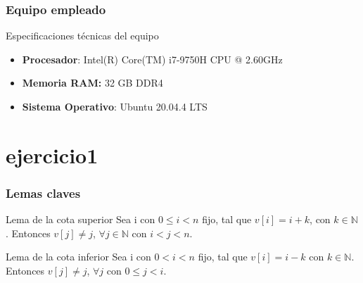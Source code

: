 \documentclass[13pt]{beamer}
\begin{document}
    \begin{frame}
        \frametitle{Equipo empleado}

        \begin{block}{Especificaciones técnicas del equipo}
            \begin{itemize}
                \item \textbf{Procesador}: Intel(R) Core(TM) i7-9750H CPU @ 2.60GHz
                \item \textbf{Memoria RAM:} 32 GB DDR4
                \item \textbf{Sistema Operativo}: Ubuntu 20.04.4 LTS
            \end{itemize}
        \end{block}
    \end{frame}



    \section{ejercicio1}

    \begin{frame}
        \frametitle{Lemas claves}
            \begin{block}{Lema de la cota superior}
                \label{lem:1}
                Sea i con $0 \leqslant i < n$ fijo, tal que $v[i]=i+k$, con $k \in \mathbb N$. 
                Entonces $v[j] \neq j$, $\forall j \in \mathbb N$ con $i < j < n$. 
            \end{block}
            \begin{block}{Lema de la cota inferior}
                \label{lem:2}
                Sea i con $0 < i < n$ fijo, tal que $v[i]=i-k$ con 
                $k \in \mathbb N$. Entonces $v[j] \neq j$,  $\forall j$ con $0 \leqslant j < i$. 
            \end{block}
    \end{frame}


\end{document}
